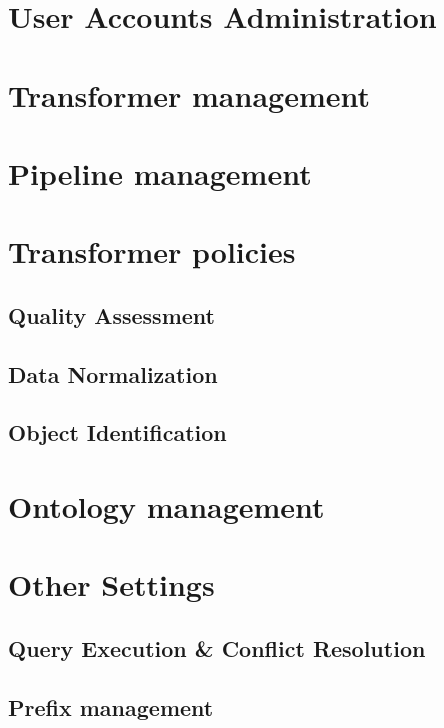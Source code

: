 \section{User Accounts Administration}

\section{Transformer management}

\section{Pipeline management}

\section{Transformer policies}

\subsection*{Quality Assessment}

\subsection*{Data Normalization}

\subsection*{Object Identification}

\section{Ontology management}

\section{Other Settings}

\subsection{Query Execution \& Conflict Resolution}

\subsection{Prefix management}
\label{sec:frontendPrefixMgmt}

